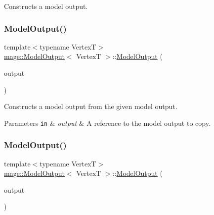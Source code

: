 Constructs a model output. \hypertarget{structmage_1_1_model_output_aac808e40a66f33da4ea28ebb7443623d}{}\label{structmage_1_1_model_output_aac808e40a66f33da4ea28ebb7443623d} 
\subsubsection{\texorpdfstring{Model\+Output()}{ModelOutput()}\hspace{0.1cm}{\footnotesize\ttfamily [2/3]}}
{\footnotesize\ttfamily template$<$typename VertexT$>$ \\
\hyperlink{structmage_1_1_model_output}{mage\+::\+Model\+Output}$<$ VertexT $>$\+::\hyperlink{structmage_1_1_model_output}{Model\+Output} (\begin{DoxyParamCaption}\item[{const \hyperlink{structmage_1_1_model_output}{Model\+Output}$<$ VertexT $>$ \&}]{output }\end{DoxyParamCaption})\hspace{0.3cm}{\ttfamily [delete]}}

Constructs a model output from the given model output.


\begin{DoxyParams}[1]{Parameters}
\mbox{\tt in}  & {\em output} & A reference to the model output to copy. \\
\hline
\end{DoxyParams}
\hypertarget{structmage_1_1_model_output_a20faa6e5b76ec7903a09e222e61e5353}{}\label{structmage_1_1_model_output_a20faa6e5b76ec7903a09e222e61e5353} 
\subsubsection{\texorpdfstring{Model\+Output()}{ModelOutput()}\hspace{0.1cm}{\footnotesize\ttfamily [3/3]}}
{\footnotesize\ttfamily template$<$typename VertexT$>$ \\
\hyperlink{structmage_1_1_model_output}{mage\+::\+Model\+Output}$<$ VertexT $>$\+::\hyperlink{structmage_1_1_model_output}{Model\+Output} (\begin{DoxyParamCaption}\item[{\hyperlink{structmage_1_1_model_output}{Model\+Output}$<$ VertexT $>$ \&\&}]{output }\end{DoxyParamCaption})\hspace{0.3cm}{\ttfamily [default]}}

